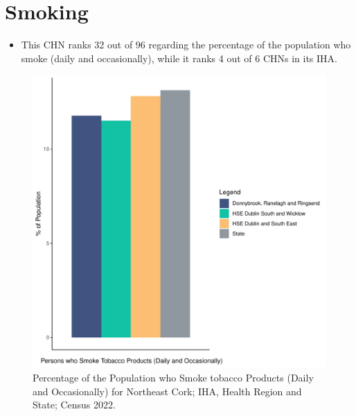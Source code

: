 \documentclass{article}
\begin{document}
\pagebreak

\section{Smoking}\label{sect:Smoking}
\begin{itemize}
\item This CHN ranks  32 out of 96 regarding the percentage of the population who smoke (daily and occasionally), while it ranks   4 out of 6 CHNs in its IHA.
\end{itemize}
\begin{figure}[H]
	\centering
	\includegraphics[width = 120mm]{../figures/SmokingED.pdf}
	\caption{Percentage of the Population who Smoke tobacco Products (Daily and Occasionally) for Northeast Cork; IHA, Health Region and State; Census 2022.}
	\label{fig:2ae19629-1a6a-13a3-e055-000000000001}
	\end{figure}
	
\end{document}
